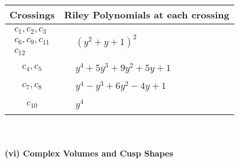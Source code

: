 \documentclass[1p]{elsarticle_modified}
\theoremstyle{definition}
\begin{document}
\begin{tabular}{m{50pt}|m{274pt}}
Crossings & \hspace{64pt}Riley Polynomials at each crossing \\
\hline $$\begin{aligned}c_{1},c_{2},c_{3}\\c_{6},c_{9},c_{11}\\c_{12}\end{aligned}$$&$\begin{aligned}
&(y^2+y+1)^2
\end{aligned}$\\
\hline $$\begin{aligned}c_{4},c_{5}\end{aligned}$$&$\begin{aligned}
&y^4+5 y^3+9 y^2+5 y+1
\end{aligned}$\\
\hline $$\begin{aligned}c_{7},c_{8}\end{aligned}$$&$\begin{aligned}
&y^4- y^3+6 y^2-4 y+1
\end{aligned}$\\
\hline $$\begin{aligned}c_{10}\end{aligned}$$&$\begin{aligned}
&y^4
\end{aligned}$\\
\hline
\end{tabular}\\~\\
\newpage\flushleft \textbf{(vi) Complex Volumes and Cusp Shapes}
\end{document}
